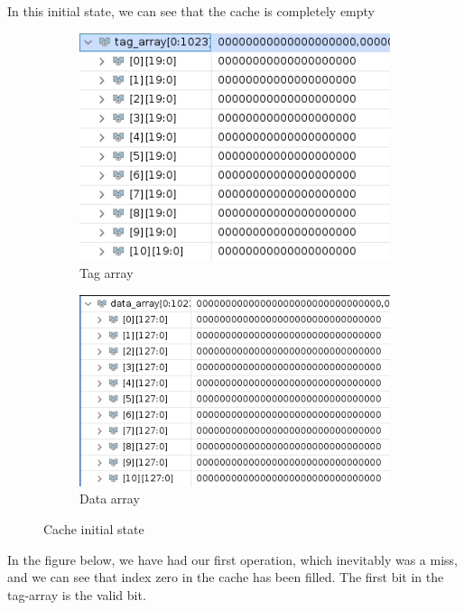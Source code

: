 \documentclass{article}
\begin{document}
In this initial state, we can see that the cache is completely empty
\begin{figure}[H]
\centering
\begin{subfigure}{.5\textwidth}
  \centering
  \includegraphics[width=.8\linewidth]{img/tag0.png}
  \caption{Tag array}
\end{subfigure}%
\begin{subfigure}{.5\textwidth}
  \centering
  \includegraphics[width=.9\linewidth]{img/data0.png}
  \caption{Data array}
\end{subfigure}
\caption{Cache initial state}
\end{figure}


In the figure below, we have had our first operation, which inevitably was a miss, and we can see that index zero in the cache has been filled. The first bit in the tag-array is the valid bit.
\end{document}
